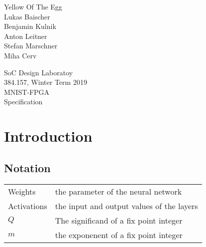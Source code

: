 \documentclass[a4paper]{article}
\begin{document}

\begin{titlepage}
	
	\begin{flushright}
		
		
		\Large 
		Yellow Of The Egg\\
		\large
		Lukas Baischer	\\
		Benjamin Kulnik	\\
		Anton Leitner \\
		Stefan Marschner \\
		Miha Cerv \\
		
	\end{flushright}
	
	\vspace{5em}
	
	\begin{center}
		{\Large SoC Design Laboratoy}\\[1em]
		{\large 384.157, Winter Term 2019} \\[5em]

		
		{\Huge MNIST-FPGA\\[.5em]
		\huge Specification}\\[10em]
	\end{center}

\end{titlepage}


\begin{acronym}
\end{acronym}


\tableofcontents
\clearpage

\section{Introduction}

\subsection*{Notation}
\begin{center}
\begin{tabular}{lp{3.5in}}
	Weights 	& the parameter of the neural network		\\
	Activations	& the input and output values of the layers	\\
	$Q$			& The significand of a fix point integer 	\\
	$m$			& the exponenent of a fix point integer
\end{tabular}
\end{center}
\end{document}

